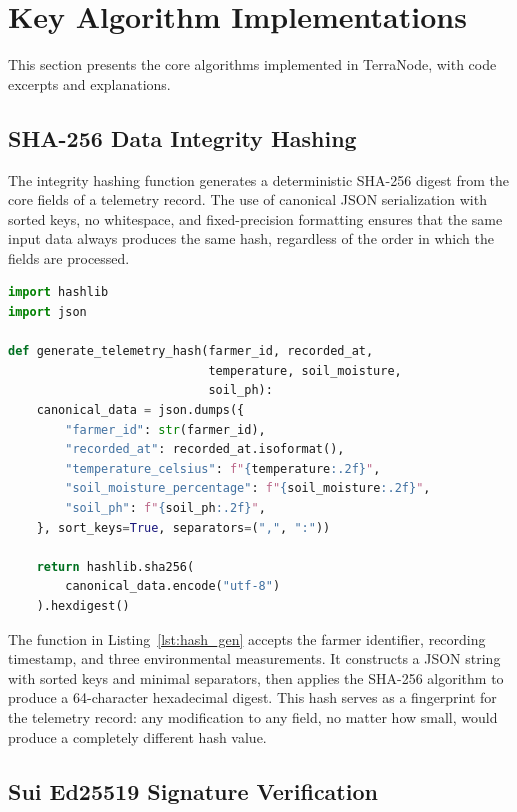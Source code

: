 \section{Key Algorithm Implementations}

This section presents the core algorithms implemented in TerraNode, with code excerpts and explanations.

\subsection{SHA-256 Data Integrity Hashing}

The integrity hashing function generates a deterministic SHA-256 digest from the core fields of a telemetry record. The use of canonical JSON serialization with sorted keys, no whitespace, and fixed-precision formatting ensures that the same input data always produces the same hash, regardless of the order in which the fields are processed.

\noindent\begin{minipage}{\textwidth}
\begin{lstlisting}[language=Python, caption={Telemetry Data Integrity Hash Generation}, label={lst:hash_gen}]
import hashlib
import json

def generate_telemetry_hash(farmer_id, recorded_at,
                            temperature, soil_moisture,
                            soil_ph):
    canonical_data = json.dumps({
        "farmer_id": str(farmer_id),
        "recorded_at": recorded_at.isoformat(),
        "temperature_celsius": f"{temperature:.2f}",
        "soil_moisture_percentage": f"{soil_moisture:.2f}",
        "soil_ph": f"{soil_ph:.2f}",
    }, sort_keys=True, separators=(",", ":"))

    return hashlib.sha256(
        canonical_data.encode("utf-8")
    ).hexdigest()
\end{lstlisting}
\end{minipage}

The function in Listing~\ref{lst:hash_gen} accepts the farmer identifier, recording timestamp, and three environmental measurements. It constructs a JSON string with sorted keys and minimal separators, then applies the SHA-256 algorithm to produce a 64-character hexadecimal digest. This hash serves as a fingerprint for the telemetry record: any modification to any field, no matter how small, would produce a completely different hash value.

\subsection{Sui Ed25519 Signature Verification}

